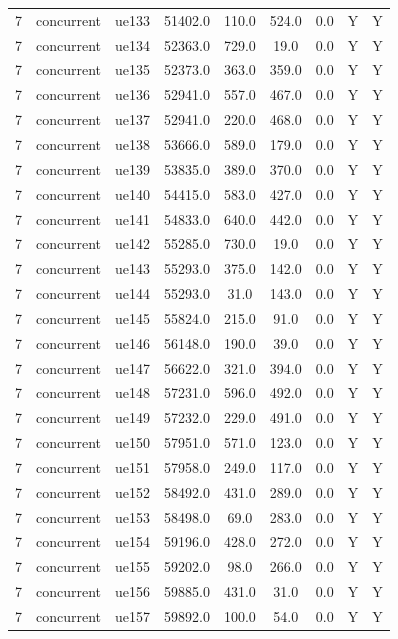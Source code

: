 \begin{table}[ht]
\begin{tabular}{|c|c|c|c|c|c|c|c|c|}
7 & concurrent & ue133 & 51402.0 & 110.0 & 524.0 & 0.0 & Y & Y \\
7 & concurrent & ue134 & 52363.0 & 729.0 & 19.0 & 0.0 & Y & Y \\
7 & concurrent & ue135 & 52373.0 & 363.0 & 359.0 & 0.0 & Y & Y \\
7 & concurrent & ue136 & 52941.0 & 557.0 & 467.0 & 0.0 & Y & Y \\
7 & concurrent & ue137 & 52941.0 & 220.0 & 468.0 & 0.0 & Y & Y \\
7 & concurrent & ue138 & 53666.0 & 589.0 & 179.0 & 0.0 & Y & Y \\
7 & concurrent & ue139 & 53835.0 & 389.0 & 370.0 & 0.0 & Y & Y \\
7 & concurrent & ue140 & 54415.0 & 583.0 & 427.0 & 0.0 & Y & Y \\
7 & concurrent & ue141 & 54833.0 & 640.0 & 442.0 & 0.0 & Y & Y \\
7 & concurrent & ue142 & 55285.0 & 730.0 & 19.0 & 0.0 & Y & Y \\
7 & concurrent & ue143 & 55293.0 & 375.0 & 142.0 & 0.0 & Y & Y \\
7 & concurrent & ue144 & 55293.0 & 31.0 & 143.0 & 0.0 & Y & Y \\
7 & concurrent & ue145 & 55824.0 & 215.0 & 91.0 & 0.0 & Y & Y \\
7 & concurrent & ue146 & 56148.0 & 190.0 & 39.0 & 0.0 & Y & Y \\
7 & concurrent & ue147 & 56622.0 & 321.0 & 394.0 & 0.0 & Y & Y \\
7 & concurrent & ue148 & 57231.0 & 596.0 & 492.0 & 0.0 & Y & Y \\
7 & concurrent & ue149 & 57232.0 & 229.0 & 491.0 & 0.0 & Y & Y \\
7 & concurrent & ue150 & 57951.0 & 571.0 & 123.0 & 0.0 & Y & Y \\
7 & concurrent & ue151 & 57958.0 & 249.0 & 117.0 & 0.0 & Y & Y \\
7 & concurrent & ue152 & 58492.0 & 431.0 & 289.0 & 0.0 & Y & Y \\
7 & concurrent & ue153 & 58498.0 & 69.0 & 283.0 & 0.0 & Y & Y \\
7 & concurrent & ue154 & 59196.0 & 428.0 & 272.0 & 0.0 & Y & Y \\
7 & concurrent & ue155 & 59202.0 & 98.0 & 266.0 & 0.0 & Y & Y \\
7 & concurrent & ue156 & 59885.0 & 431.0 & 31.0 & 0.0 & Y & Y \\
7 & concurrent & ue157 & 59892.0 & 100.0 & 54.0 & 0.0 & Y & Y \\

\end{tabular}
\end{table}
